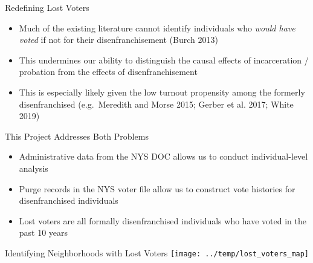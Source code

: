 \documentclass[
  ignorenonframetext,
]{beamer}
\providecommand{\tightlist}{%
  \setlength{\itemsep}{0pt}\setlength{\parskip}{0pt}}
\begin{document}
\begin{frame}{Redefining Lost Voters}
\protect\hypertarget{redefining-lost-voters}{}
\begin{itemize}[<+->]
\tightlist
\item
  Much of the existing literature cannot identify individuals who
  \emph{would have voted} if not for their disenfranchisement (Burch
  2013)
\end{itemize}

\begin{itemize}[<+->]
\tightlist
\item
  This undermines our ability to distinguish the causal effects of
  incarceration / probation from the effects of disenfranchisement
\end{itemize}

\begin{itemize}[<+->]
\tightlist
\item
  This is especially likely given the low turnout propensity among the
  formerly disenfranchised (e.g.~Meredith and Morse 2015; Gerber et al.
  2017; White 2019)
\end{itemize}
\end{frame}

\begin{frame}{This Project Addresses Both Problems}
\protect\hypertarget{this-project-addresses-both-problems}{}
\begin{itemize}[<+->]
\tightlist
\item
  Administrative data from the NYS DOC allows us to conduct
  individual-level analysis
\end{itemize}

\begin{itemize}[<+->]
\tightlist
\item
  Purge records in the NYS voter file allow us to construct vote
  histories for disenfranchised individuals
\end{itemize}

\begin{itemize}[<+->]
\tightlist
\item
  Lost voters are all formally disenfranchised individuals who have
  voted in the past 10 years
\end{itemize}
\end{frame}

\begin{frame}{Identifying Neighborhoods with Lost Voters}
\protect\hypertarget{identifying-neighborhoods-with-lost-voters}{}
\texttt{[image: ../temp/lost\_voters\_map]}
\end{frame}
\end{document}
